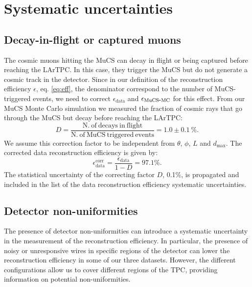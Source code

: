 \documentclass[a4paper]{scrartcl}
\def\myhyphen{{\hbox{-}}}
\begin{document}
\section{Systematic uncertainties}
\subsection{Decay-in-flight or captured muons}\label{sec:dif}
The cosmic muons hitting the MuCS can decay in flight or being captured before reaching the LArTPC. In this case, they trigger the MuCS but do not generate a cosmic track in the detector. Since in our definition of the reconstruction efficiency $\epsilon$, eq. \eqref{eq:eff}, the denominator correspond to the number of MuCS-triggered events, we need to correct $\epsilon_{\mathrm{data}}$ and $\epsilon_{\mathrm{MuCS\myhyphen MC}}$ for this effect. From our MuCS Monte Carlo simulation we measured the fraction of cosmic rays that go through the MuCS but decay before reaching the LArTPC:
\begin{equation}
D = \frac{\mathrm{N.~of~decays~in~flight}}{\mathrm{N.~of~MuCS~triggered~events}} = 1.0 \pm 0.1~\%.
\end{equation}
We assume this correction factor to be independent from $\theta$, $\phi$, $L$ and $d_{\mathrm{max}}$. The corrected data reconstruction efficiency is given by:
\begin{equation}
\epsilon_{\mathrm{data}}^{\mathrm{corr}} =  \frac{\epsilon_{\mathrm{data}}}{1-D} = 97.1\%.
\end{equation}
The statistical uncertainty of the correcting factor $D$, 0.1\%, is propagated and included in the list of the data reconstruction efficiency systematic uncertainties.

\subsection{Detector non-uniformities}\label{sec:wires}
The presence of detector non-uniformities can introduce a systematic uncertainty in the measurement of the reconstruction efficiency. In particular, the presence of noisy or unresponsive wires in specific regions of the detector can lower the reconstruction efficiency in some of our three datasets. However, the different configurations allow us to cover different regions of the TPC, providing information on potential non-uniformities.
\end{document}
